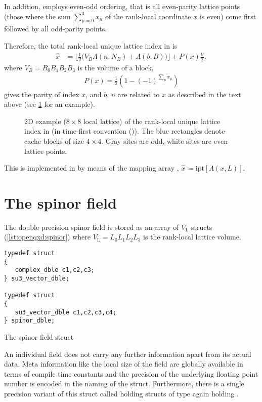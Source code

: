 In addition, \openqxd employs even-odd ordering, that is all even-parity lattice points (those where the sum $\sum_{\mu=0}^3 x_\mu$ of the rank-local coordinate $x$ is even) come first followed by all odd-parity points.

Therefore, the total rank-local unique lattice index in \openqxd is
\begin{align} \label{eq:openqcd:ipt}
\hat{x} &= \biggl \lfloor \frac{1}{2} \Big( V_B \Lambda(n, N_B) + \Lambda(b, B) \Big) \biggr \rfloor + P(x) \frac{V}{2},
\end{align}
where $V_B = B_0 B_1 B_2 B_3$ is the volume of a block,
\begin{align} \label{eq:parity}
P(x)=\tfrac{1}{2}(1-(-1)^{\sum_\mu x_\mu})
\end{align}
gives the parity of index $x$, and $b$, $n$ are related to $x$ as described in the text above (see \cref{fig:index} for an example).
\begin{figure}
  \caption{2D example ($8 \times 8$ local lattice) of the rank-local unique lattice index in \openqxd (in time-first convention (\txyz)). The blue rectangles denote cache blocks of size $4 \times 4$. Gray sites are odd, white sites are even lattice points.}
  \label{fig:index}
\end{figure}
This is implemented in \openqxd by means of the mapping array , $\hat{x} \coloneqq \text{ipt}\left[\Lambda(x,L)\right]$.

\section{The spinor field}
\label{sec:openqxd:spinor_field}

The double precision spinor field is stored as an array of $V_\mathrm{L}$  structs (\cref{lst:openqxd:spinor}) where $V_\mathrm{L} = L_0 L_1 L_2 L_3$ is the rank-local lattice volume.
\begin{codelisting}
\begin{verbatim}
typedef struct
{
   complex_dble c1,c2,c3;
} su3_vector_dble;

typedef struct
{
   su3_vector_dble c1,c2,c3,c4;
} spinor_dble;
\end{verbatim}
\caption{The spinor field struct}
\label{lst:openqxd:spinor}
\end{codelisting}
An individual field does not carry any further information apart from its actual data. Meta information like the local size of the field are globally available in terms of compile time constants and the precision of the underlying floating point number is encoded in the naming of the struct.
Furthermore, there is a single precision variant of this struct called  holding structs of type  again holding .


